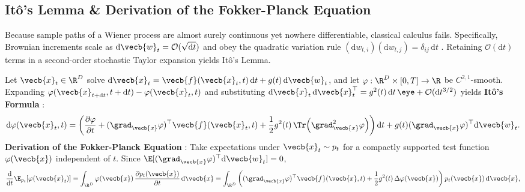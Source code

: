 \documentclass[../../../../master.tex]{subfiles}
\begin{document}
\subsection{It\^o's Lemma \& Derivation of the Fokker-Planck Equation}\label{sec:sde:ito_fp}

Because sample paths of a Wiener process are almost surely continuous yet nowhere differentiable, classical calculus fails. Specifically, Brownian increments scale as $\mathrm{d}\vecb{w}_t = \mathcal{O}(\sqrt{\mathrm{d}t})$ and obey the quadratic variation rule $(\mathrm{d}w_{t,i})(\mathrm{d}w_{t,j}) = \delta_{ij}\,\mathrm{d}t$ . Retaining $\mathcal{O}(\mathrm{d}t)$ terms in a second-order stochastic Taylor expansion yields It\^o's Lemma.

\begin{coremath}
Let $\vecb{x}_t \in \R^D$ solve $\mathrm{d}\vecb{x}_t = \vecb{f}(\vecb{x}_t, t)\,\mathrm{d}t + g(t)\,\mathrm{d}\vecb{w}_t$, and let $\varphi : \R^D \times [0, T] \to \R$ be $C^{2,1}$-smooth. Expanding $\varphi(\vecb{x}_{t+\mathrm{d}t}, t+\mathrm{d}t) - \varphi(\vecb{x}_t, t)$ and substituting $\mathrm{d}\vecb{x}_t\,\mathrm{d}\vecb{x}_t^\top = g^2(t)\,\mathrm{d}t\,\eye + \mathcal{O}(\mathrm{d}t^{3/2})$ yields \textbf{It\^o's Formula} :
\begin{equation}\label{eq:sde:ito_lemma}
  \mathrm{d}\varphi(\vecb{x}_t, t) = \left( \frac{\partial \varphi}{\partial t} + (\grad_{\vecb{x}}\varphi)^\top \vecb{f}(\vecb{x}_t, t) + \frac{1}{2}g^2(t)\,\Tr\!\left(\grad_{\vecb{x}}^2 \varphi\right) \right)\mathrm{d}t + g(t)(\grad_{\vecb{x}}\varphi)^\top \mathrm{d}\vecb{w}_t.
\end{equation}
\textbf{Derivation of the Fokker-Planck Equation} : Take expectations under $\vecb{x}_t \sim p_t$ for a compactly supported test function $\varphi(\vecb{x})$ independent of $t$. Since $\E[(\grad_{\vecb{x}}\varphi)^\top \mathrm{d}\vecb{w}_t] = 0$,
\begin{equation}\label{eq:sde:fp_step1}
  \frac{\mathrm{d}}{\mathrm{d}t}\E_{p_t}[\varphi(\vecb{x}_t)] = \int_{\R^D} \varphi(\vecb{x})\,\frac{\partial p_t(\vecb{x})}{\partial t}\,\mathrm{d}\vecb{x} = \int_{\R^D} \left( (\grad_{\vecb{x}}\varphi)^\top \vecb{f}(\vecb{x}, t) + \frac{1}{2}g^2(t)\,\Delta \varphi(\vecb{x}) \right) p_t(\vecb{x})\,\mathrm{d}\vecb{x},

\end{equation}
\end{coremath}
\end{document}
